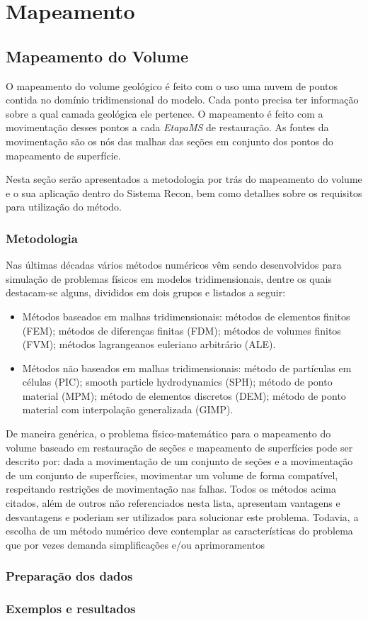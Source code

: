 
\chapter{Mapeamento}

\section{Mapeamento do Volume}

O mapeamento do volume geológico é feito com o uso uma nuvem de pontos contida no domínio tridimensional do modelo. Cada ponto precisa ter informação sobre a qual camada geológica ele pertence. O mapeamento é feito com a movimentação desses pontos a cada \textit{EtapaMS} de restauração. As fontes da movimentação são os nós das malhas das seções em conjunto dos pontos do mapeamento de superfície.

Nesta seção serão apresentados a metodologia por trás do mapeamento do volume e o sua aplicação dentro do Sistema Recon, bem como detalhes sobre os requisitos para utilização do método.

\subsection{Metodologia}

Nas últimas décadas vários métodos numéricos vêm sendo desenvolvidos para simulação de problemas físicos em modelos tridimensionais, dentre os quais destacam-se alguns, divididos em dois grupos e listados a seguir:

\renewcommand{\labelitemi}{•}
\begin{itemize}
  \item Métodos baseados em malhas tridimensionais: métodos de elementos finitos (FEM)\cite{MEF}; métodos de diferenças finitas (FDM)\cite{MDF}; métodos de volumes finitos (FVM)\cite{MVF}; métodos lagrangeanos euleriano arbitrário (ALE)\cite{ALE}.
  \item Métodos não baseados em malhas tridimensionais: método de partículas em células (PIC)\cite{PIC}; smooth particle hydrodynamics (SPH)\cite{SPH}; método de ponto material (MPM)\cite{MPM}; método de elementos discretos (DEM)\cite{DEM}; método de ponto material com interpolação generalizada (GIMP)\cite{GIMP}\cite{MullerGIMP}.
\end{itemize}

De maneira genérica, o problema físico-matemático para o mapeamento do volume baseado em restauração de seções e mapeamento de superfícies pode ser descrito por: dada a movimentação de um conjunto de seções e a movimentação de um conjunto de superfícies, movimentar um volume de forma compatível, respeitando restrições de movimentação nas falhas. Todos os métodos acima citados, além de outros não referenciados nesta lista, apresentam vantagens e desvantagens e poderiam ser utilizados para solucionar este problema. Todavia, a escolha de um método numérico deve contemplar as características do problema que por vezes demanda simplificações e/ou aprimoramentos

\subsection{Preparação dos dados}

\subsection{Exemplos e resultados}


